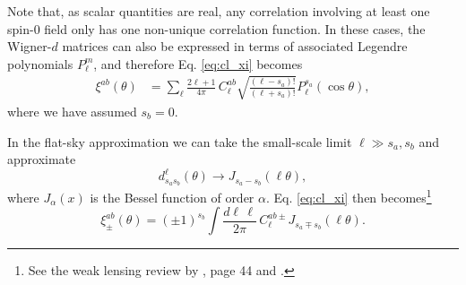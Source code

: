 \documentclass[\docopts]{\docclass}
\begin{document}
Note that, as scalar quantities are real, any correlation involving at least one spin-$0$ field only has one non-unique correlation function. In these cases, the Wigner-$d$ matrices can also be expressed in terms of associated Legendre polynomials $P^m_\ell$, and therefore Eq. \ref{eq:cl_xi} becomes
\begin{align}
  \xi^{ab}(\theta)&=\sum_\ell\frac{2\ell+1}{4\pi}\,C^{ab}_\ell\sqrt{\frac{(\ell-s_a)!}{(\ell+s_a)!}}P^{s_a}_\ell(\cos\theta)\label{eq:xigg},
\end{align}
where we have assumed $s_b=0$.

In the flat-sky approximation we can take the small-scale limit $\ell\gg s_a,s_b$ and approximate 
\begin{equation}
  d_{s_as_b}^\ell(\theta)\longrightarrow J_{s_a-s_b}(\ell\theta),
\end{equation}
where $J_\alpha(x)$ is the Bessel function of order $\alpha$. Eq. \ref{eq:cl_xi} then becomes\footnote{See the weak lensing review by \citet{Bartelmann01}, page 44 and \citet{Joachimi10}.}
\begin{equation}
  \xi^{ab}_{\pm}(\theta)=\left(\pm1\right)^{s_b}\int\frac{d\ell\,\ell}{2\pi}\,C^{ab\pm}_\ell J_{s_a\mp s_b}(\ell\theta).
\end{equation}
\end{document}
